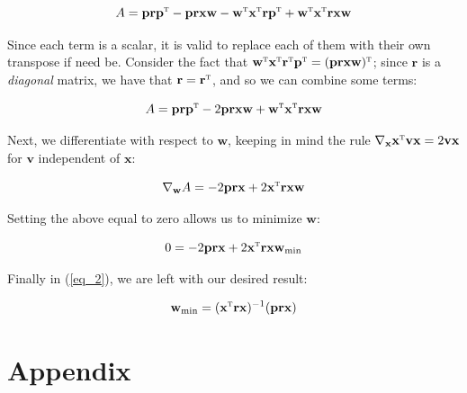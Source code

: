 \documentclass[a4paper,10pt,english]{article}
\begin{document}
\begin{multicols*}{2}
\begin{equation*}
A = \mathbf{p} \mathbf{r} \mathbf{p}^\textsc{t} - \mathbf{p} \mathbf{r} \mathbf{x} \mathbf{w} - \mathbf{w}^\textsc{t} \mathbf{x}^\textsc{t} \mathbf{r} \mathbf{p}^\textsc{t} + \mathbf{w}^\textsc{t} \mathbf{x}^\textsc{t} \mathbf{r} \mathbf{x} \mathbf{w}
\end{equation*}

Since each term is a scalar, it is valid to replace each of them with their own transpose if need be. Consider the fact that $\mathbf{w}^\textsc{t} \mathbf{x}^\textsc{t} \mathbf{r}^\textsc{t} \mathbf{p}^\textsc{t} = (\mathbf{p} \mathbf{r} \mathbf{x} \mathbf{w})^\textsc{t}$; since $\mathbf{r}$ is a \textit{diagonal} matrix, we have that $\mathbf{r} = \mathbf{r}^\textsc{t}$, and so we can combine some terms:

\begin{equation*}
A = \mathbf{p} \mathbf{r} \mathbf{p}^\textsc{t} - 2 \mathbf{p} \mathbf{r} \mathbf{x} \mathbf{w} + \mathbf{w}^\textsc{t} \mathbf{x}^\textsc{t} \mathbf{r} \mathbf{x} \mathbf{w}
\end{equation*}

Next, we differentiate with respect to $\mathbf{w}$, keeping in mind the rule $\nabla_\mathbf{x} \mathbf{x}^\textsc{t} \mathbf{v} \mathbf{x} = 2 \mathbf{v} \mathbf{x}$ for $\mathbf{v}$ independent of $\mathbf{x}$:

\begin{equation*}
\nabla_\mathbf{w} A = - 2 \mathbf{p} \mathbf{r} \mathbf{x} + 2 \mathbf{x}^\textsc{t} \mathbf{r} \mathbf{x} \mathbf{w}
\end{equation*}

Setting the above equal to zero allows us to minimize $\mathbf{w}$:

\begin{equation*}
0 = - 2 \mathbf{p} \mathbf{r} \mathbf{x} + 2 \mathbf{x}^\textsc{t} \mathbf{r} \mathbf{x} \mathbf{w}_\text{min}
\end{equation*}

Finally in (\ref{eq_2}), we are left with our desired result:

\begin{equation}
\label{eq_2}
\mathbf{w}_\text{min} = ( \mathbf{x}^\textsc{t} \mathbf{r} \mathbf{x} )^{-1} ( \mathbf{p} \mathbf{r} \mathbf{x} )
\end{equation}

\newpage
\section*{Appendix}


\end{multicols*}
\end{document}
